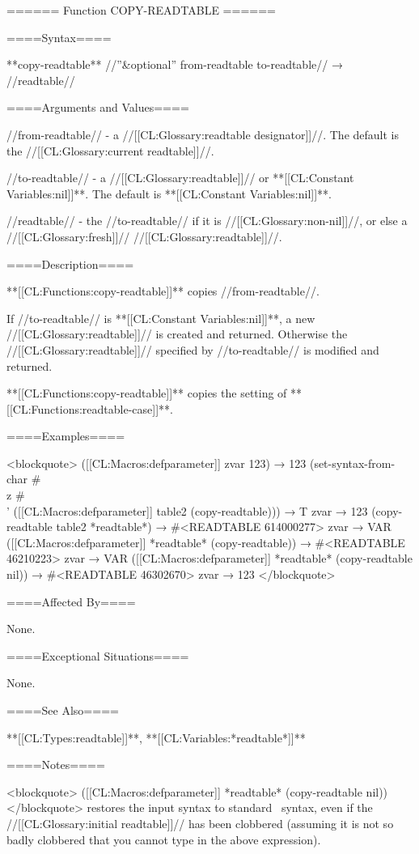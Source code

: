 ====== Function COPY-READTABLE ======

====Syntax====

**{copy-readtable}** //''&optional'' from-readtable to-readtable// → //readtable//

====Arguments and Values====

//from-readtable// - a //[[CL:Glossary:readtable designator]]//. The default is the //[[CL:Glossary:current readtable]]//.

//to-readtable// - a //[[CL:Glossary:readtable]]// or **[[CL:Constant Variables:nil]]**. The default is **[[CL:Constant Variables:nil]]**.

//readtable// - the //to-readtable// if it is //[[CL:Glossary:non-nil]]//, or else a //[[CL:Glossary:fresh]]// //[[CL:Glossary:readtable]]//.

====Description====

**[[CL:Functions:copy-readtable]]** copies //from-readtable//.

If //to-readtable// is **[[CL:Constant Variables:nil]]**, a new //[[CL:Glossary:readtable]]// is created and returned. Otherwise the //[[CL:Glossary:readtable]]// specified by //to-readtable// is modified and returned.

**[[CL:Functions:copy-readtable]]** copies the setting of **[[CL:Functions:readtable-case]]**.

====Examples====

<blockquote> ([[CL:Macros:defparameter]] zvar 123) → 123 (set-syntax-from-char #\\z #\\' ([[CL:Macros:defparameter]] table2 (copy-readtable))) → T zvar → 123 (copy-readtable table2 *readtable*) → #<READTABLE 614000277> zvar → VAR ([[CL:Macros:defparameter]] *readtable* (copy-readtable)) → #<READTABLE 46210223> zvar → VAR ([[CL:Macros:defparameter]] *readtable* (copy-readtable nil)) → #<READTABLE 46302670> zvar → 123 </blockquote>

====Affected By====

None.

====Exceptional Situations====

None.

====See Also====

**[[CL:Types:readtable]]**, **[[CL:Variables:*readtable*]]**

====Notes====

<blockquote> ([[CL:Macros:defparameter]] *readtable* (copy-readtable nil)) </blockquote> restores the input syntax to standard \clisp\ syntax, even if the //[[CL:Glossary:initial readtable]]// has been clobbered (assuming it is not so badly clobbered that you cannot type in the above expression).

